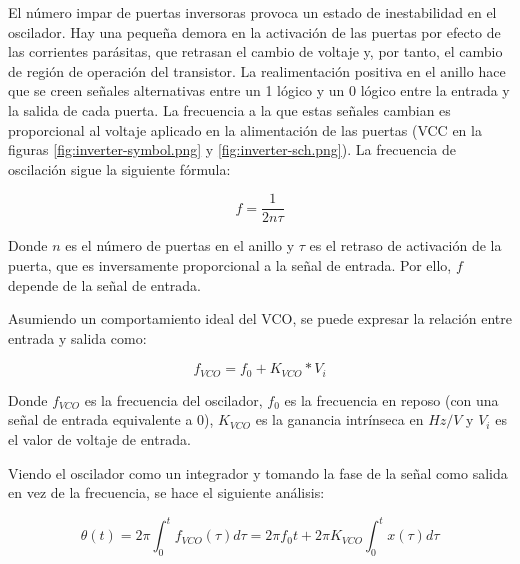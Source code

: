 \documentclass[12pt]{report} %
\begin{document}
	El número impar de puertas inversoras provoca un estado de inestabilidad en el oscilador. Hay una pequeña demora en la activación de las puertas por efecto de las corrientes parásitas, que retrasan el cambio de voltaje y, por tanto, el cambio de región de operación del transistor. La realimentación positiva en el anillo hace que se creen señales alternativas entre un 1 lógico y un 0 lógico entre la entrada y la salida de cada puerta. La frecuencia a la que estas señales cambian es proporcional al voltaje aplicado en la alimentación de las puertas (VCC en la figuras \ref{fig:inverter-symbol.png} y \ref{fig:inverter-sch.png}). La frecuencia de oscilación sigue la siguiente fórmula:
	
	\begin{figure}[H]
		\begin{equation}
			\label{vco-freq-sw-t}
			f = \frac{1}{2 n \tau}
		\end{equation}
		\footnotemark
	\end{figure}
	
	Donde $n$ es el número de puertas en el anillo y $\tau$ es el retraso de activación de la puerta, que es inversamente proporcional a la señal de entrada. Por ello, $f$ depende de la señal de entrada.
	
	Asumiendo un comportamiento ideal del VCO, se puede expresar la relación entre entrada y salida como:
	\begin{figure}[H]
		\begin{equation}
			\label{vco-freq-ideal}
			f_{VCO}= f_{0} + K_{VCO} * V_{i}
		\end{equation}
		\footnotemark
	\end{figure}
	
	Donde $f_{VCO}$ es la frecuencia del oscilador, $f_{0}$ es la frecuencia en reposo (con una señal de entrada equivalente a 0), $K_{VCO}$ es la ganancia intrínseca en $Hz/V$ y $V_{i}$ es el valor de voltaje de entrada.
	
	Viendo el oscilador como un integrador y tomando la fase de la señal como salida en vez de la frecuencia, se hace el siguiente análisis:
	
	\begin{figure}[H]
		\begin{equation}
			\label{vco-phase}
			\theta(t) = 2\pi\int_{0}^{t}f_{VCO}(\tau)d\tau = 2\pi f_{0}t + 2\pi K_{VCO}\int_{0}^{t}x(\tau)d\tau
		\end{equation}
		\footnotemark
	\end{figure}
	
\end{document}
